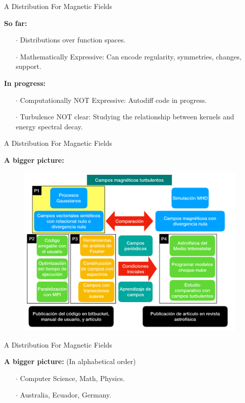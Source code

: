 \documentclass{beamer}
\begin{document}
\begin{frame}{A Distribution For Magnetic Fields}

  \textbf{So far:}
  \begin{itemize}
    \item[$\cdot$] Distributions over function spaces.
    \item[$\cdot$] Mathematically Expressive: Can encode regularity, symmetries, changes, support.
  \end{itemize}

  \textbf{In progress:}
  \begin{itemize}
    \item[$\cdot$] Computationally NOT Expressive: Autodiff code in progress.
    \item[$\cdot$] Turbulence NOT clear: Studying the relationship between kernels and energy spectral decay.
  \end{itemize}

\end{frame}

\begin{frame}{A Distribution For Magnetic Fields}

  \textbf{A bigger picture:}
  \begin{figure}
    \includegraphics[width=\linewidth]{plots/Sub-proyectos.pdf}
  \end{figure}

\end{frame}

\begin{frame}{A Distribution For Magnetic Fields}

  \textbf{A bigger picture:} (In alphabetical order)

  \vspace{1em}

  \begin{itemize}
    \item[$\cdot$] Computer Science, Math, Physics.
    \item[$\cdot$] Australia, Ecuador, Germany.
  \end{itemize}
\end{frame}
\end{document}
